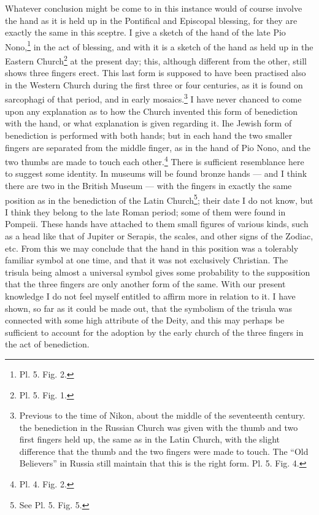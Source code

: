 \documentclass[a4paper, 11pt, oneside, english]{article}
\begin{document}
Whatever conclusion might be come to in this instance would of course involve the hand as it is held up in the Pontifical and Episcopal blessing, for they are exactly the same in this sceptre. I give a sketch of the hand of the late Pio Nono,\footnote{Pl. 5. Fig. 2.} in the act of blessing, and with it is a sketch of the hand as held up in the Eastern Church\footnote{Pl. 5. Fig. 1.} at the present day; this, although different from the other, still shows three fingers erect. This last form is supposed to have been practised also in the Western Church during the first three or four centuries, as it is found on sarcophagi of that period, and in early mosaics.\footnote{Previous to the time of Nikon, about the middle of the seventeenth century. the benediction in the Russian Church was given with the thumb and two first fingers held up, the same as in the Latin Church, with the slight difference that the thumb and the two fingers were made to touch. The ``Old Believers'' in Russia still maintain that this is the right form. Pl. 5. Fig. 4.} I have never chanced to come upon any explanation as to how the Church invented this form of benediction with the hand, or what explanation is given regarding it. Ihe Jewish form of benediction is performed with both hands; but in each hand the two smaller fingers are separated from the middle finger, as in the hand of Pio Nono, and the two thumbs are made to touch each other.\footnote{Pl. 4. Fig. 2.} There is sufficient resemblance here to suggest some identity. In museums will be found bronze hands --- and I think there are two in the British Museum --- with the fingers in exactly the same position as in the benediction of the Latin Church\footnote{See Pl. 5. Fig. 5.}; their date I do not know, but I think they belong to the late Roman period; some of them were found in Pompeii. These hands have attached to them small figures of various kinds, such as a head like that of Jupiter or Serapis, the scales, and other signs of the Zodiac, etc. From this we may conclude that the hand in this position was a tolerably familiar symbol at one time, and that it was not exclusively Christian. The trisula being almost a universal symbol gives some probability to the supposition that the three fingers are only another form of the same. With our present knowledge I do not feel myself entitled to affirm more in relation to it. I have shown, so far as it could be made out, that the symbolism of the trisula was connected with some high attribute of the Deity, and this may perhaps be sufficient to account for the adoption by the early church of the three fingers in the act of benediction.
\end{document}

